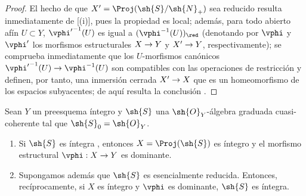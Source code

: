 \documentclass[oneside,10pt]{amsart}
\makeatletter
\newcommand{\ega@arrow}[2]{\mathchoice{#1}{#2}{#2}{#2}}
\renewcommand{\to}{\ega@arrow{\longrightarrow}{\rightarrow}}
\let\EGAOriginalLabel\label
\renewcommand{\label}[1]{\phantomsection\EGAOriginalLabel{#1}}
\makeatother
\begin{document}
\begin{proof}
El hecho de que $X'=\Proj(\sh{S}/\sh{N}_+)$ sea reducido resulta inmediatamente de [(i)], pues la propiedad es local; además, para todo abierto afín $U\subset Y$, ${\vphi'}^{-1}(U)$ es igual a $(\vphi^{-1}(U))_\red$ (denotando por $\vphi$ y $\vphi'$ los morfismos estructurales $X\to Y$ y $X'\to Y$, respectivamente); se comprueba inmediatamente que los $U$-morfismos canónicos ${\vphi'}^{-1}(U)\to\vphi^{-1}(U)$ son compatibles con las operaciones de restricción y definen, por tanto, una inmersión cerrada $X'\to X$ que es un homeomorfismo de los espacios subyacentes; de aquí resulta la conclusión .
\end{proof}

\begin{proposition}[3.1.14]
\label{II.3.1.14}
Sean $Y$ un preesquema íntegro y $\sh{S}$ una $\sh{O}_Y$-álgebra graduada cuasi-coherente tal que $\sh{S}_0=\sh{O}_Y$.
\begin{enumerate}
  \item[(i)] Si $\sh{S}$ es íntegra , entonces $X=\Proj(\sh{S})$ es íntegro y el morfismo estructural $\vphi:X\to Y$ es dominante.
  \item[(ii)] Supongamos además que $\sh{S}$ es esencialmente reducida.
    Entonces, recíprocamente, si $X$ es íntegro y $\vphi$ es dominante, $\sh{S}$ es íntegra.
\end{enumerate}
\end{proposition}
\end{document}
